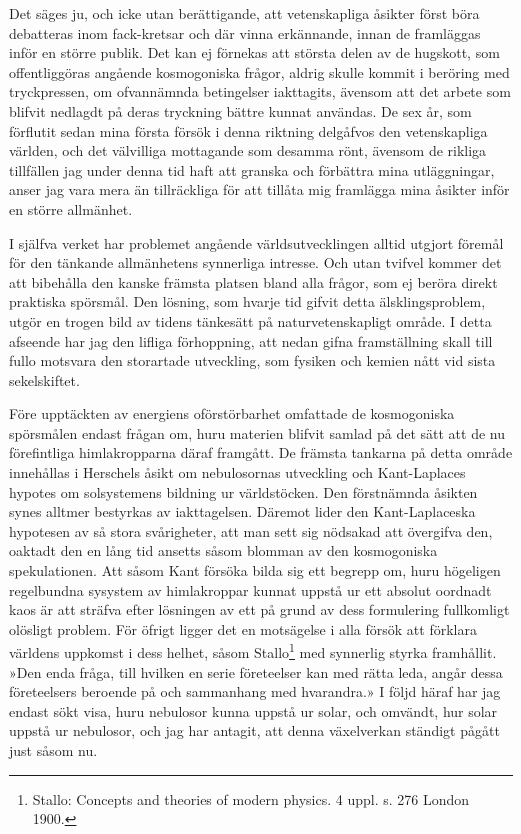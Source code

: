 \documentclass[a4paper, 12pt, oneside, swedish]{article}
\begin{document}
Det säges ju, och icke utan berättigande, att vetenskapliga åsikter först böra debatteras inom fack-kretsar och där vinna erkännande, innan de framläggas inför en större publik. Det kan ej förnekas att största delen av de hugskott, som offentliggöras angående kosmogoniska frågor, aldrig skulle kommit i beröring med tryckpressen, om ofvannämnda betingelser iakttagits, ävensom att det arbete som blifvit nedlagdt på deras tryckning bättre kunnat användas. De sex år, som förflutit sedan mina första försök i denna riktning delgåfvos den vetenskapliga världen, och det välvilliga mottagande som desamma rönt, ävensom de rikliga tillfällen jag under denna tid haft att granska och förbättra mina utläggningar, anser jag vara mera än tillräckliga för att tillåta mig framlägga mina åsikter inför en större allmänhet.

I själfva verket har problemet angående världsutvecklingen alltid utgjort föremål för den tänkande allmänhetens synnerliga intresse. Och utan tvifvel kommer det att bibehålla den kanske främsta platsen bland alla frågor, som ej beröra direkt praktiska spörsmål. Den lösning, som hvarje tid gifvit detta älsklingsproblem, utgör en trogen bild av tidens tänkesätt på naturvetenskapligt område. I detta afseende har jag den lifliga förhoppning, att nedan gifna framställning skall till fullo motsvara den storartade utveckling, som fysiken och kemien nått vid sista sekelskiftet.

Före upptäckten av energiens oförstörbarhet omfattade de kosmogoniska spörsmålen endast frågan om, huru materien blifvit samlad på det sätt att de nu förefintliga himlakropparna däraf framgått. De främsta tankarna på detta område innehållas i Herschels åsikt om nebulosornas utveckling och Kant-Laplaces hypotes om solsystemens bildning ur världstöcken. Den förstnämnda åsikten synes alltmer bestyrkas av iakttagelsen. Däremot lider den Kant-Laplaceska hypotesen av så stora svårigheter, att man sett sig nödsakad att övergifva den, oaktadt den en lång tid ansetts såsom blomman av den kosmogoniska spekulationen. Att såsom Kant försöka bilda sig ett begrepp om, huru högeligen regelbundna sysystem av himlakroppar kunnat uppstå ur ett absolut oordnadt kaos är att sträfva efter lösningen av ett på grund av dess formulering fullkomligt olösligt problem. För öfrigt ligger det en motsägelse i alla försök att förklara världens uppkomst i dess helhet, såsom Stallo\footnote{Stallo: Concepts and theories of modern physics. 4 uppl. s. 276 London 1900.} med synnerlig styrka framhållit. »Den enda fråga, till hvilken en serie företeelser kan med rätta leda, angår dessa företeelsers beroende på och sammanhang med hvarandra.» I följd häraf har jag endast sökt visa, huru nebulosor kunna uppstå ur solar, och omvändt, hur solar uppstå ur nebulosor, och jag har antagit, att denna växelverkan ständigt pågått just såsom nu.
\end{document}
